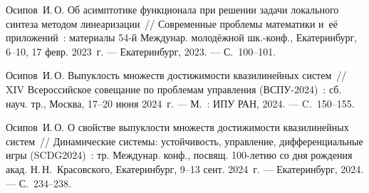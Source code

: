 Осипов~И.\,О. Об асимптотике функционала при решении задачи локального синтеза методом линеаризации~// Современные проблемы математики и~её приложений~: материалы 54-й Междунар. молодёжной шк.-конф., Екатеринбург, 6--10, 17 февр. 2023~г. --- Екатеринбург, 2023. --- С.~100--101.

Осипов~И.\,О. Выпуклость множеств достижимости квазилинейных систем~// XIV Всероссийское совещание по проблемам управления (ВСПУ-2024)~: сб. науч. тр., Москва, 17--20 июня 2024~г. --- М.~: ИПУ РАН, 2024. --- C.~150--155.

Осипов~И.\,О. О свойстве выпуклости множеств достижимости квазилинейных систем~// Динамические системы: устойчивость, управление, дифференциальные игры (SCDG2024)~: тр. Междунар. конф., посвящ. 100-летию со дня рождения акад. Н.\,Н.~Красовского, Екатеринбург, 9--13 сент. 2024~г. --- Екатеринбург, 2024. --- С.~234--238. 
